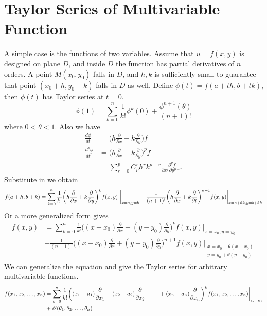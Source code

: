 \documentclass[25pt]{article}
\begin{document}
\section{Taylor Series of Multivariable Function}
A simple case is the functions of two variables. Assume that $u = f(x,y) $ is designed on plane $D$, and inside $D$ the function has partial derivatives of $n$ orders. A point $M(x_0, y_0) $ falls in $D$, and $h, k$ is sufficiently small to guarantee that point $(x_0+h,y_0 + k)$ falls in $D$ as well. Define $\phi(t) = f(a+th, b+tk)$, then $\phi(t)$ has Taylor series at $t=0$.
\begin{equation}
    \phi(1) = \sum_{k=0}^{n} \frac{1}{k!} \phi^{k}(0) + \frac{\phi^{n+1}(\theta)}{(n+1)!} 
\end{equation}
where $0 < \theta < 1$.
Also we have
\begin{equation}
\begin{aligned}
    \frac{d \phi}{dt} &= \bigg(h\frac{\partial }{\partial x} + k\frac{\partial }{\partial y}  \bigg)f \\
    \frac{d^p \phi}{dt^p} &= \bigg(h \frac{\partial }{\partial x} + k \frac{\partial}{\partial y} \bigg)^p f \\
    &= \sum_{r=0}^{p} C_{p}^{r} h^r k^{p-r} \frac{\partial^p f}{\partial x^r \partial y^{p-r}}
\end{aligned}
\end{equation}
Substitute in we obtain
\begin{equation}
\begin{aligned}
    f(a+h, b+k) = \sum_{k=0}^{n} \frac{1}{k!}\bigg(h\frac{\partial}{\partial x} + k\frac{\partial}{\partial y} \bigg)^k f(x, y)~\bigg|_{x=a,y=b} + \frac{1}{(n+1)!} \bigg(h\frac{\partial}{\partial x} + k\frac{\partial}{\partial t} \bigg)^{n+1} f(x,y) \bigg|_{x=a+\theta k, y= b+\theta k} \notag
\end{aligned}
\end{equation}
Or a more generalized form gives
\begin{equation}
\begin{aligned}
    f(x, y) &= \sum_{k=0}^{n} \frac{1}{k!} \bigg( (x-x_0)\frac{\partial}{\partial x} + (y-y_0)\frac{\partial }{\partial y} \bigg)^k f(x,y) \bigg|_{x=x_0,y=y_0} \\&+\frac{1}{(n+1)!} \bigg( (x-x_0)\frac{\partial}{\partial x } + (y-y_0)\frac{\partial}{\partial y} \bigg)^{n+1} f(x,y) \bigg|_{\substack{x=x_0 + \theta(x-x_0) \\ y = y_0 + \theta(y-y_0)}}
\end{aligned}
\end{equation}
We can generalize the equation and give the Taylor series for arbitrary multivariable functions.
\begin{equation}
\begin{aligned}
    f(x_1, x_2, \dots, x_n) &= \sum_{k=0}^{n}\frac{1}{k!} \bigg((x_1 - a_1)\frac{\partial}{\partial x_1} + (x_2 - a_2)\frac{\partial }{\partial x_2}+ \dots + (x_n - a_n)\frac{\partial}{\partial x_n} \bigg)^kf(x_1, x_2, \dots, x_n) \bigg|_{x_i = a_i}\\
    &+\mathscr{O}(\theta_1,\theta_2,\dots,\theta_n)
    \notag
\end{aligned}
\end{equation}
\end{document}
